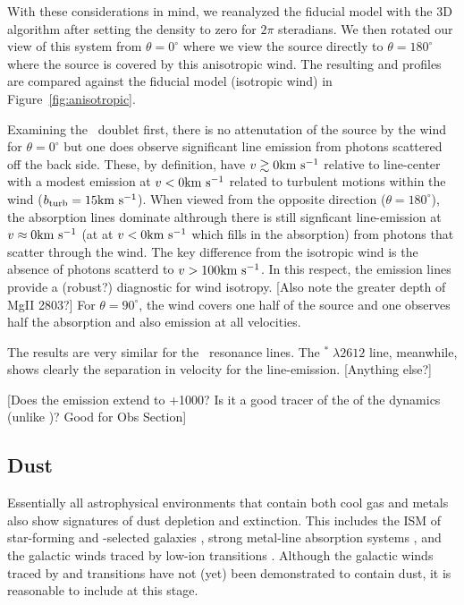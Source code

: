 \documentclass[12pt,preprint]{aastex}
\begin{document}
With these considerations in mind, we reanalyzed the fiducial model
with the 3D algorithm after setting the density to zero for $2\pi$ steradians.
We then rotated our view of this system from $\theta = 0^\circ$ where
we view the source directly to $\theta = 180^\circ$ where the source
is covered by this anisotropic wind.  The resulting  and
 profiles are compared against the fiducial model
(isotropic wind) in Figure~\ref{fig:anisotropic}.  

Examining the \mgiid\ doublet first, 
there is no attenutation of the source by the wind for $\theta =
0^\circ$
but one does observe significant line emission from photons scattered
off the back side.  These, by definition, have $v \gtrsim 0 {\rm km~s^{-1}}$
relative to line-center with a modest emission at $v<0 {\rm km~s^{-1}}$ related
to turbulent motions within the wind ($b_{\rm turb} = 15 {\rm km~s^{-1}}$).
When viewed from the opposite direction ($\theta = 180^\circ$), the
absorption lines dominate althrough there is still signficant
line-emission at $v \approx 0 {\rm km~s^{-1}}$ (at at $v < 0 {\rm km~s^{-1}}$ which fills
in the absorption) from photons that scatter through the wind.  The
key difference from the isotropic wind is the absence of photons
scatterd to $v > 100 {\rm km~s^{-1}}$.  In this respect, the emission lines
provide a (robust?) diagnostic for wind isotropy.  [Also note the
greater depth of MgII 2803?]
For $\theta = 90^\circ$, the wind covers one half of the source and
one observes half the absorption and also emission at all velocities.

The results are very similar for the \feiid\ resonance lines.  The
$^* \; \lambda 2612$ line, meanwhile, shows clearly the
separation in velocity for the line-emission.   [Anything else?]


[Does the emission extend to +1000\kms?  Is it a good tracer of the of
the dynamics (unlike \lya)? Good for Obs Section]

\subsection{Dust}

Essentially all astrophysical environments that contain both cool gas
and metals also show signatures of dust depletion and extinction.  This includes the
ISM of star-forming and -selected galaxies
\citep[e.g.][]{ss96,pw01,pcd+07}, strong  metal-line
absorption systems \citep{york,menard}, and the galactic winds traced
by low-ion transitions \citep{cb58,naI}.  Although the galactic winds
traced by  and  transitions have not (yet) been
demonstrated to contain dust, it is reasonable to include at this
stage.  
\end{document}

